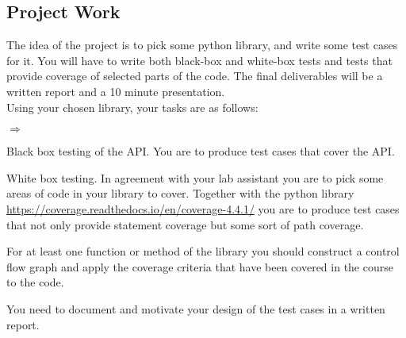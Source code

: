 \documentclass[a4page]{article}
\begin{document}
\subsection{Project Work}

The idea of the project is to pick some python library, and write some
test cases for it. You will have to write both black-box and white-box
tests and tests that provide coverage of selected parts of the
code. The final deliverables will be a written report and a 10 minute
presentation.\\

Using your chosen library, your tasks are as follows:
\begin{list}{$\Rightarrow$}{} 
    \item  Black box testing of the API. You are to produce test cases
      that cover the API.
    \item  White box testing. In agreement with your lab assistant you
      are to pick some areas of code in your library to cover. Together with
      the python library
      \url{https://coverage.readthedocs.io/en/coverage-4.4.1/} you are
      to produce test cases that not only provide statement coverage
      but some sort of path coverage. 
    \item For at least one function or method of the library you
      should construct a control flow graph and apply the coverage criteria
      that have been covered in the course to the code.
    \item You need to document and motivate your design of the test cases in
      a written report. 
\end{list}
\end{document}
